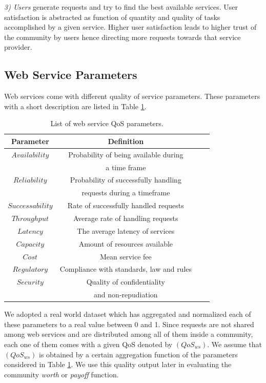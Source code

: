 \emph{3) Users} generate requests and try to find the best
available services. User satisfaction is abstracted as function of
quantity and quality of tasks accomplished by a given service.
Higher user satisfaction leads to higher trust of the community by users hence directing more requests towards that service provider.

\subsection{Web Service Parameters}\label{ws_parameters}

Web services come with different quality of service parameters.
These parameters with a short description are listed in Table
\ref{qosws}.

\begin{table}[!t]
\centering
\caption{List of web service QoS parameters.}
\begin{tabular}{|c|c||c|c|}
\hline
\textbf{Parameter} & \textbf{Definition} \\
\hline\hline
$Availability$ & Probability of being available during \\
&a time frame \\
$Reliability$ & Probability of successfully handling \\
&requests during a timeframe\\
$Successability$ & Rate of successfully handled requests \\
$Throughput$ & Average rate of handling requests \\
$Latency$ & The average latency of services\\
$Capacity$ & Amount of resources available\\
$Cost$ & Mean service fee \\
$Regulatory$ & Compliance with standards, law and rules\\
$Security$ & Quality of confidentiality \\
&and non-repudiation\\
\hline
\end{tabular}
\label{qosws}
\end{table}


We adopted a real world dataset \cite{DBLP:conf/smc/Al-MasriM09a}
which has aggregated and normalized each of these parameters to a
real value between 0 and 1. Since requests are not shared among
web services and are distributed among all of them inside a
community, each one of them comes with a given QoS denoted by
$(QoS_{ws})$. We assume that $(QoS_{ws})$ is obtained by a certain
aggregation function of the parameters considered in Table
\ref{qosws}. We use this quality output later in evaluating the
community \emph{worth} or \emph{payoff} function.

